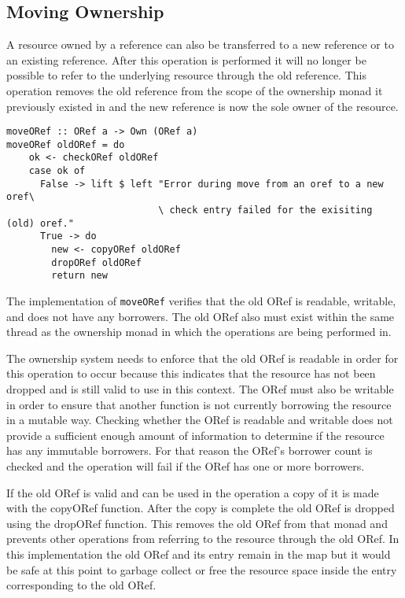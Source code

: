 \documentclass[onehalf,11pt]{beavtex}
\begin{document}
\subsection{Moving Ownership}

A resource owned by a reference can also be transferred to a new reference or
to an existing reference. After this operation is performed it will no longer
be possible to refer to the underlying resource through the old reference. This
operation removes the old reference from the scope of the ownership monad it
previously existed in and the new reference is now the sole owner of the
resource.

\begin{verbatim}
moveORef :: ORef a -> Own (ORef a)
moveORef oldORef = do
    ok <- checkORef oldORef
    case ok of
      False -> lift $ left "Error during move from an oref to a new oref\
                           \ check entry failed for the exisiting (old) oref."
      True -> do
        new <- copyORef oldORef
        dropORef oldORef
        return new
\end{verbatim}

The implementation of \texttt{moveORef} verifies that the old ORef is readable,
writable, and does not have any borrowers. The old ORef also must exist
within the same thread as the ownership monad in which the operations are being
performed in.

The ownership system needs to enforce that the old ORef is readable in order
for this operation to occur because this indicates that the resource has not
been dropped and is still valid to use in this context.
The ORef must also be writable in order to ensure that another function
is not currently borrowing the resource in a mutable way.
Checking whether the ORef is readable and writable does not provide a
sufficient enough amount of information to determine if the resource
has any immutable borrowers. For that reason the ORef's borrower count is
checked and the operation will fail if the ORef has one or more borrowers.

If the old ORef is valid and can be used in the operation a copy of it is made
with the copyORef function. After the copy is complete the old ORef is dropped
using the dropORef function. This removes the old ORef from that monad and
prevents other operations from referring to the resource through the old ORef.
In this implementation the old ORef and its entry remain in the map but
it would be safe at this point to garbage collect or free the resource space
inside the entry corresponding to the old ORef.
\end{document}
